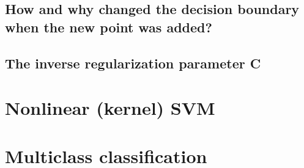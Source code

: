 \documentclass{article}
\begin{document}
\subsection{How and why changed the decision boundary when the new point was added?}



\subsection{The inverse regularization parameter C}


\section{Nonlinear (kernel) SVM}

\subsection{}

\subsection{}

\subsection{}

\subsection{}

\subsection{}


\section{Multiclass classification}

\subsection{}

\subsection{}

\subsection{}
\end{document}
